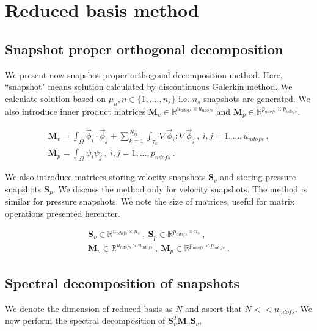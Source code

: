 \documentclass[graybox]{svmult}
\begin{document}
\section{Reduced basis method}

\subsection{Snapshot proper orthogonal decomposition}\label{POD_section}

We present now snapshot proper orthogonal decomposition method. Here, ``snapshot" means solution calculated by discontinuous Galerkin method. We calculate solution based on $\mu_n, n \in \lbrace 1,....,n_s \rbrace$ i.e. $n_s$ snapshots are generated. We also introduce inner product matrices $\bm{M}_v \in \mathbb{R}^{u_{ndofs} \times u_{ndofs}}$ and $\bm{M}_p \in \mathbb{R}^{p_{ndofs} \times p_{ndofs}}$.

\begin{gather*}
\bm{M}_v = \int_{\Omega} \overrightarrow{\phi}_i \cdot \overrightarrow{\phi}_j + \sum_{k=1}^{N_{el}} \int_{\tau_k} \nabla \overrightarrow{\phi}_i : \nabla \overrightarrow{\phi}_j \ , \ i,j = 1, \ldots, u_{ndofs} \ , \\
\bm{M}_p = \int_{\Omega} \psi_i \psi_j \ , \ i,j = 1, \ldots, p_{ndofs} \ .
\end{gather*}

We also introduce matrices storing velocity snapshots $\bm{S}_v$ and storing pressure snapshots $\bm{S}_p$. We discuss the method only for velocity snapshots. The method is similar for pressure snapshots. We note the size of matrices, useful for matrix operations presented hereafter.

\begin{gather*}
\bm{S}_v \in \mathbb{R}^{u_{ndofs} \times n_s} \ , \ \bm{S}_p \in \mathbb{R}^{p_{ndofs} \times n_s} \ , \\
\bm{M}_v \in \mathbb{R}^{u_{ndofs} \times u_{ndofs}} \ ,\ \bm{M}_p \in \mathbb{R}^{p_{ndofs} \times p_{ndofs}} \ .
\end{gather*}

\subsection{Spectral decomposition of snapshots}\label{spectral_decomposition_section}

We denote the dimension of reduced basis as $N$ and assert that $N << u_{ndofs}$. We now perform the spectral decomposition of $\bm{S}_v^T \bm{M}_v \bm{S}_v$,
\end{document}
